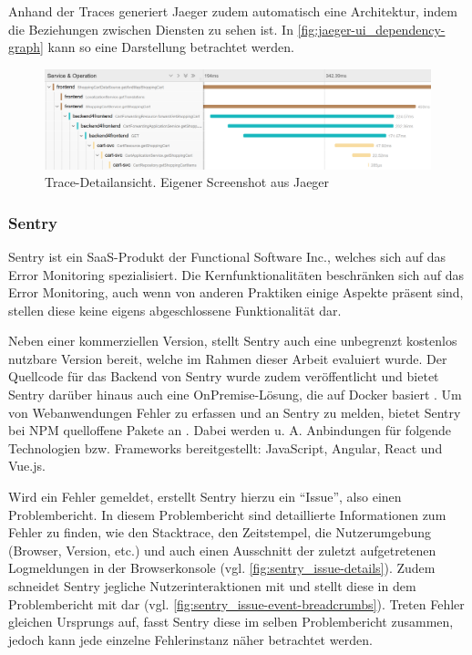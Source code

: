 Anhand der Traces generiert Jaeger zudem automatisch eine Architektur, indem die Beziehungen zwischen Diensten zu sehen ist. In \autoref{fig:jaeger-ui_dependency-graph} kann so eine Darstellung betrachtet werden.

\begin{figure}[H]
	\centering
	\includegraphics[width=\linewidth]{img/03_methoden/jaeger_trace-detail-view.png}
	\caption{Trace-Detailansicht. Eigener Screenshot aus Jaeger}
	\label{fig:jaeger-ui_trace-detail-view}
\end{figure}

\subsubsection{Sentry}
\label{subsec:sentry}

Sentry \cite{Sentry} ist ein SaaS-Produkt der Functional Software Inc., welches sich auf das Error Monitoring spezialisiert. Die Kernfunktionalitäten beschränken sich auf das Error Monitoring, auch wenn von anderen Praktiken einige Aspekte präsent sind, stellen diese keine eigens abgeschlossene Funktionalität dar.

Neben einer kommerziellen Version, stellt Sentry auch eine unbegrenzt kostenlos nutzbare Version bereit, welche im Rahmen dieser Arbeit evaluiert wurde. Der Quellcode für das Backend von Sentry wurde zudem veröffentlicht und bietet Sentry darüber hinaus auch eine OnPremise-Lösung, die auf Docker basiert \cite{SentrySelfHosted}. Um von Webanwendungen Fehler zu erfassen und an Sentry zu melden, bietet Sentry bei NPM \cite{NPM} quelloffene Pakete an \cite{SentryJSGithub}. Dabei werden u. A. Anbindungen für folgende Technologien bzw. Frameworks bereitgestellt: JavaScript, Angular, React und Vue.js.

Wird ein Fehler gemeldet, erstellt Sentry hierzu ein \enquote{Issue}, also einen Problembericht. In diesem Problembericht sind detaillierte Informationen zum Fehler zu finden, wie den Stacktrace, den Zeitstempel, die Nutzerumgebung (Browser, Version, etc.) und auch einen Ausschnitt der zuletzt aufgetretenen Logmeldungen in der Browserkonsole (vgl. \autoref{fig:sentry_issue-details}). Zudem schneidet Sentry jegliche Nutzerinteraktionen mit und stellt diese in dem Problembericht mit dar (vgl. \autoref{fig:sentry_issue-event-breadcrumbs}). Treten Fehler gleichen Ursprungs auf, fasst Sentry diese im selben Problembericht zusammen, jedoch kann jede einzelne Fehlerinstanz näher betrachtet werden.

